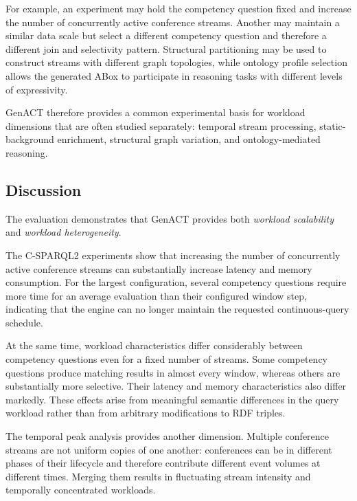 For example, an experiment may hold the competency question fixed and increase
the number of concurrently active conference streams. Another may maintain a
similar data scale but select a different competency question and therefore a
different join and selectivity pattern. Structural partitioning may be used to
construct streams with different graph topologies, while ontology profile
selection allows the generated ABox to participate in reasoning tasks with
different levels of expressivity.

GenACT therefore provides a common experimental basis for workload dimensions
that are often studied separately: temporal stream processing, static-background
enrichment, structural graph variation, and ontology-mediated reasoning.


\subsection{Discussion}
\label{subsec:genact-evaluation-discussion}

The evaluation demonstrates that GenACT provides both \emph{workload
scalability} and \emph{workload heterogeneity}.

The C-SPARQL2 experiments show that increasing the number of concurrently active
conference streams can substantially increase latency and memory consumption.
For the largest configuration, several competency questions require more time
for an average evaluation than their configured window step, indicating that
the engine can no longer maintain the requested continuous-query schedule.

At the same time, workload characteristics differ considerably between
competency questions even for a fixed number of streams. Some competency
questions produce matching results in almost every window, whereas others are
substantially more selective. Their latency and memory characteristics also
differ markedly. These effects arise from meaningful semantic differences in
the query workload rather than from arbitrary modifications to RDF triples.

The temporal peak analysis provides another dimension. Multiple conference
streams are not uniform copies of one another: conferences can be in different
phases of their lifecycle and therefore contribute different event volumes at
different times. Merging them results in fluctuating stream intensity and
temporally concentrated workloads.

